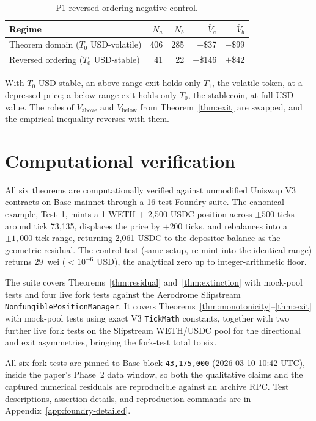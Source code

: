 \documentclass{manuscript}
\begin{document}
\begin{table}[H]
\centering
\caption{P1 reversed-ordering negative control.}
\label{tab:exit-control}
\begin{tabular}{@{}lrrrr@{}}
\toprule
Regime & $N_a$ & $N_b$ & $\bar V_a$ & $\bar V_b$ \\
\midrule
Theorem domain ($T_0$ USD-volatile) & 406 & 285 & $-$\$37  & $-$\$99 \\
Reversed ordering ($T_0$ USD-stable) & 41  & 22  & $-$\$146 & $+$\$42 \\
\bottomrule
\end{tabular}
\end{table}

With $T_0$ USD-stable, an above-range exit holds only $T_1$, the volatile token, at a depressed price; a below-range exit holds only $T_0$, the stablecoin, at full USD value. The roles of $V_{\text{above}}$ and $V_{\text{below}}$ from Theorem~\ref{thm:exit} are swapped, and the empirical inequality reverses with them.

\section{Computational verification}\label{sec:foundry}

All six theorems are computationally verified against unmodified Uniswap V3 contracts on Base mainnet through a 16-test Foundry suite. The canonical example, Test~1, mints a 1 WETH $+$ 2{,}500 USDC position across $\pm 500$ ticks around tick 73{,}135, displaces the price by $+200$ ticks, and rebalances into a $\pm 1{,}000$-tick range, returning 2{,}061 USDC to the depositor balance as the geometric residual. The control test (same setup, re-mint into the identical range) returns 29~wei ($<\!10^{-6}$ USD), the analytical zero up to integer-arithmetic floor.

The suite covers Theorems~\ref{thm:residual} and~\ref{thm:extinction} with mock-pool tests and four live fork tests against the Aerodrome Slipstream \texttt{NonfungiblePositionManager}. It covers Theorems~\ref{thm:monotonicity}--\ref{thm:exit} with mock-pool tests using exact V3 \texttt{TickMath} constants, together with two further live fork tests on the Slipstream WETH/USDC pool for the directional and exit asymmetries, bringing the fork-test total to six.

All six fork tests are pinned to Base block \texttt{43{,}175{,}000} (2026-03-10 10:42 UTC), inside the paper's Phase~2 data window, so both the qualitative claims and the captured numerical residuals are reproducible against an archive RPC. Test descriptions, assertion details, and reproduction commands are in Appendix~\ref{app:foundry-detailed}.
\end{document}
